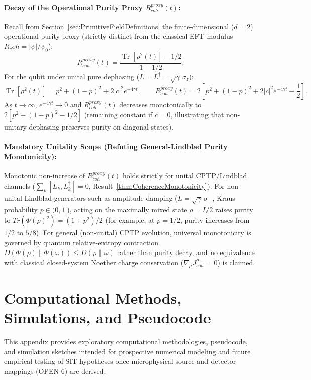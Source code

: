 \documentclass[american,11pt,letterpaper]{article}
\newcommand{\Rcoh}{R_{\mathrm{coh}}}
\def\mathrm#1{#1}%
\def\texttt#1{#1}%
\def\emph#1{#1}%
\def\Rcoh{R_coh}%
\begin{document}
\paragraph{Decay of the Operational Purity Proxy $R_{\mathrm{coh}}^{\mathrm{proxy}}(t)$:}
Recall from Section~\ref{sec:PrimitiveFieldDefinitions} the finite-dimensional ($d=2$) operational purity proxy (strictly distinct from the classical EFT modulus $\Rcoh = |\psi|/\psi_0$):
\[
R_{\mathrm{coh}}^{\mathrm{proxy}}(t) = \frac{\operatorname{Tr}[\rho^2(t)] - 1/2}{1 - 1/2}.
\]
For the qubit under unital pure dephasing ($L = L^\dagger = \sqrt{\gamma}\,\sigma_z$):
\[
\operatorname{Tr}[\rho^2(t)] = p^2 + (1-p)^2 + 2|c|^2 e^{-4\gamma t},
\qquad
R_{\mathrm{coh}}^{\mathrm{proxy}}(t) = 2\left[ p^2 + (1-p)^2 + 2|c|^2 e^{-4\gamma t} - \frac{1}{2} \right].
\]
As $t\to\infty$, $e^{-4\gamma t}\to 0$ and $R_{\mathrm{coh}}^{\mathrm{proxy}}(t)$ decreases monotonically to $2[p^2 + (1-p)^2 - 1/2]$ (remaining constant if $c = 0$, illustrating that non-unitary dephasing preserves purity on diagonal states).

\paragraph{Mandatory Unitality Scope (Refuting General-Lindblad Purity Monotonicity):}
Monotonic non-increase of $R_{\mathrm{coh}}^{\mathrm{proxy}}(t)$ holds strictly for \emph{unital} CPTP/Lindblad channels ($\sum_k [L_k, L_k^\dagger] = 0$, Result~\ref{thm:CoherenceMonotonicity}). For \emph{non-unital} Lindblad generators such as amplitude damping ($L = \sqrt{\gamma}\,\sigma_-$, Kraus probability $p \in (0,1]$), acting on the maximally mixed state $\rho = I/2$ raises purity to $\mathrm{Tr}(\Phi(\rho)^2) = (1 + p^2)/2$ (for example, at $p = 1/2$, purity increases from $1/2$ to $5/8$). For general (non-unital) CPTP evolution, universal monotonicity is governed by quantum relative-entropy contraction $D(\Phi(\rho)\|\Phi(\omega)) \le D(\rho\|\omega)$ rather than purity decay, and no equivalence with classical closed-system Noether charge conservation ($\nabla_\mu J^\mu_{\mathrm{coh}} = 0$) is claimed.

\section{Computational Methods, Simulations, and Pseudocode}
\label{appendix:tools}

This appendix provides exploratory computational methodologies, pseudocode, and simulation sketches intended for prospective numerical modeling and future empirical testing of SIT hypotheses once microphysical source and detector mappings (\texttt{OPEN-6}) are derived.
\end{document}
